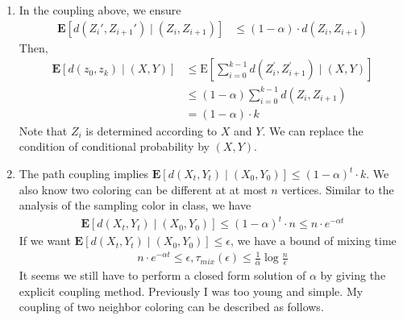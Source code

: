 \documentclass{article}
\theoremstyle{definition}
\begin{document}
\begin{enumerate}[(1)]
\begin{equation}
\begin{aligned}
			\end{aligned}
		\end{equation}	
		Now we knew the coupling is legal. If now we view $Z_i$ and $Z_{i+2}$ as a pair of adjacent couple, we can extend the legality to any length.
		\item In the coupling above, we ensure 
		\begin{equation}
			\begin{aligned}
				\mathbf{E}\left[d\left(Z_i', Z_{i+1}'\right) \mid\left(Z_i, Z_{i+1}\right)\right] & \leq (1-\alpha) \cdot d\left(Z_i, Z_{i+1}\right)
			\end{aligned}
		\end{equation}
		Then, 
		\begin{equation}
			\begin{aligned}
				\mathbf{E}\left[d\left(z_0, z_k\right) \mid\left(X,Y\right)\right] & \leq \mathrm{E}\left[\sum_{i=0}^{k-1} d\left(Z_i^{\prime}, Z_{i+1}^{\prime}\right) \mid \left( X, Y \right) \right] \\
				& \leq(1-\alpha) \sum_{i=0}^{k-1} d\left(Z_i, Z_{i+1}\right) \\
				& =(1-\alpha) \cdot k
			\end{aligned}
		\end{equation}
		Note that $Z_i$ is determined according to $X$ and $Y$. We can replace the condition of conditional probability by $(X,Y)$. 
		\item The path coupling implies $\mathbf{E}\left[d\left(X_{t}, Y_{t}\right) \mid\left(X_0,Y_0\right)\right]\leq(1-\alpha)^t \cdot k$. We also know two coloring can be different at at most $n$ vertices. Similar to the analysis of the sampling color in class, we have
		\begin{equation}
			\begin{aligned}
				\mathbf{E}\left[d\left(X_{t}, Y_{t}\right) \mid\left(X_0,Y_0\right)\right]\leq(1-\alpha)^t \cdot n \leq n\cdot e^{-\alpha t}
			\end{aligned}
		\end{equation}
		If we want $\mathbf{E}\left[d\left(X_{t}, Y_{t}\right) \mid\left(X_0,Y_0\right)\right]\leq \epsilon$, we have a bound of mixing time
		\begin{equation}
			\begin{aligned}
				n\cdot e^{-\alpha t} \leq \epsilon, \tau_{mix}(\epsilon) \leq \frac{1}{\alpha}\log\frac{n}{\epsilon}
			\end{aligned}
		\end{equation}
		It seems we still have to perform a closed form solution of $\alpha$ by giving the explicit coupling method. Previously I was too young and simple. My coupling of two neighbor coloring can be described as follows. 
		

\end{enumerate}
\end{document}
